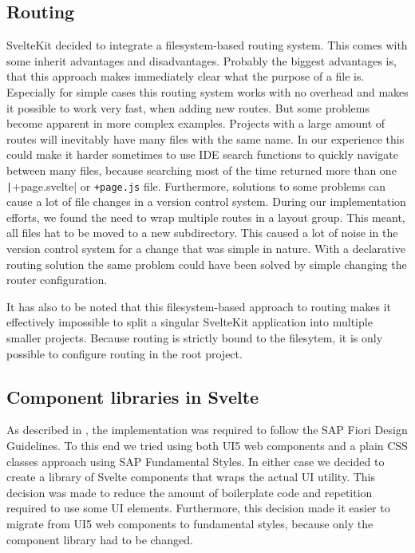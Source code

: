 \subsection{Routing}
SvelteKit decided to integrate a filesystem-based routing system. This comes with some inherit advantages and disadvantages. Probably the biggest advantages is, that this approach makes immediately clear what the purpose of a file is. Especially for simple cases this routing system works with no overhead and makes it possible to work very fast, when adding new routes. But some problems become apparent in more complex examples. Projects with a large amount of routes will inevitably have many files with the same name. In our experience this could make it harder sometimes to use IDE search functions to quickly navigate between many files, because searching most of the time returned more than one \texttt|+page.svelte| or \texttt{+page.js} file. Furthermore, solutions to some problems can cause a lot of file changes in a version control system. During our implementation efforts, we found the need to wrap multiple routes in a layout group. This meant, all files hat to be moved to a new subdirectory. This caused a lot of noise in the version control system for a change that was simple in nature. With a declarative routing solution the same problem could have been solved by simple changing the router configuration.

It has also to be noted that this filesystem-based approach to routing makes it effectively impossible to split a singular SvelteKit application into multiple smaller projects. Because routing is strictly bound to the filesytem, it is only possible to configure routing in the root project.



\subsection{Component libraries in Svelte}
\label{sec:evaluation-ui-libs}
As described in , the implementation was required to follow the SAP Fiori Design Guidelines. To this end we tried using both UI5 web components and a plain CSS classes approach using SAP Fundamental Styles. In either case we decided to create a library of Svelte components that wraps the actual UI utility. This decision was made to reduce the amount of boilerplate code and repetition required to use some UI elements. Furthermore, this decision made it easier to migrate from UI5 web components to fundamental styles, because only the component library had to be changed. 

